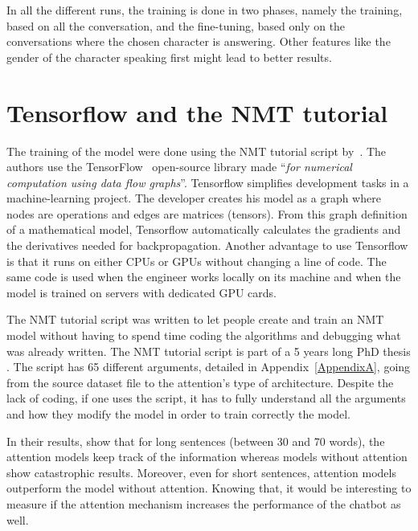 In all the different runs, the training is done in two phases, namely the training, based on all the conversation, and the fine-tuning, based only on the conversations where the chosen character is answering. Other features like the gender of the character speaking first might lead to better results.

\section{Tensorflow and the NMT tutorial}
The training of the model were done using the NMT tutorial script by~\citet{tensorflow.nmt}. The authors use the TensorFlow~\citep{tensorflow2015-whitepaper} open-source library made ``\textit{for numerical computation using data flow graphs}''. Tensorflow simplifies development tasks in a machine-learning project. The developer creates his model as a graph where nodes are operations and edges are matrices (tensors). From this graph definition of a mathematical model, Tensorflow automatically calculates the gradients and the derivatives needed for backpropagation.
Another advantage to use Tensorflow is that it runs on either CPUs or GPUs without changing a line of code. The same code is used when the engineer works locally on its machine and when the model is trained on servers with dedicated GPU cards.

The NMT tutorial script was written to let people create and train an NMT model without having to spend time coding the algorithms and debugging what was already written. The NMT tutorial script is part of a 5 years long PhD thesis \citep{nmt-phd}. The script has 65 different arguments, detailed in Appendix~\ref{AppendixA}, going from the source dataset file to the attention's type of architecture. Despite the lack of coding, if one uses the script, it has to fully understand all the arguments and how they modify the model in order to train correctly the model.

In their results, \citet{1508.04025} show that for long sentences (between 30 and 70 words), the attention models keep track of the information whereas models without attention show catastrophic results. Moreover, even for short sentences, attention models outperform the model without attention. Knowing that, it would be interesting to measure if the attention mechanism increases the performance of the chatbot as well.

